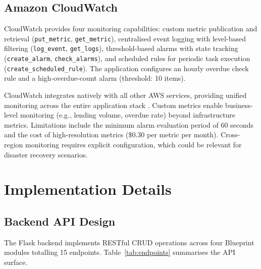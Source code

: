 \documentclass[conference]{IEEEtran}
\begin{document}
\subsection{Amazon CloudWatch}
CloudWatch provides four monitoring capabilities: custom metric publication and retrieval (\texttt{put\_metric}, \texttt{get\_metric}), centralised event logging with level-based filtering (\texttt{log\_event}, \texttt{get\_logs}), threshold-based alarms with state tracking (\texttt{create\_alarm}, \texttt{check\_alarms}), and scheduled rules for periodic task execution (\texttt{create\_scheduled\_rule}). The application configures an hourly overdue check rule and a high-overdue-count alarm (threshold: 10 items).

CloudWatch integrates natively with all other AWS services, providing unified monitoring across the entire application stack \cite{aws_cloudwatch}. Custom metrics enable business-level monitoring (e.g., lending volume, overdue rate) beyond infrastructure metrics. Limitations include the minimum alarm evaluation period of 60 seconds and the cost of high-resolution metrics (\$0.30 per metric per month). Cross-region monitoring requires explicit configuration, which could be relevant for disaster recovery scenarios.

\section{Implementation Details}

\subsection{Backend API Design}
The Flask backend implements RESTful CRUD operations across four Blueprint modules totalling 15 endpoints. Table~\ref{tab:endpoints} summarises the API surface.
\end{document}
